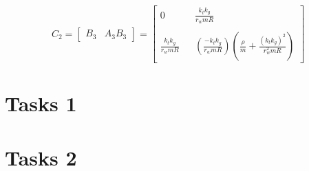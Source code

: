 \documentclass[11pt,titlepage]{report}
\begin{document}
\begin{equation} \label{eq:controllable2}
	C_{2} = \begin{bmatrix}
	  B_{3} & A_{3}B_{3} 
	\end{bmatrix} = \begin{bmatrix}
	0 & & \frac{k_{t}k_{g}}{r_{w}mR} \\ \\
	\frac{k_{t}k_{g}}{r_{w}mR} & & (\frac{-k_{t}k_{g}}{r_{w}mR})(\frac{{\rho}}{m}+\frac{(k_{t}k_{g})^2}{r_{w}^2mR})  
	\end{bmatrix}
\end{equation}
\section{Tasks 1}

\section{Tasks 2}
\end{document}
